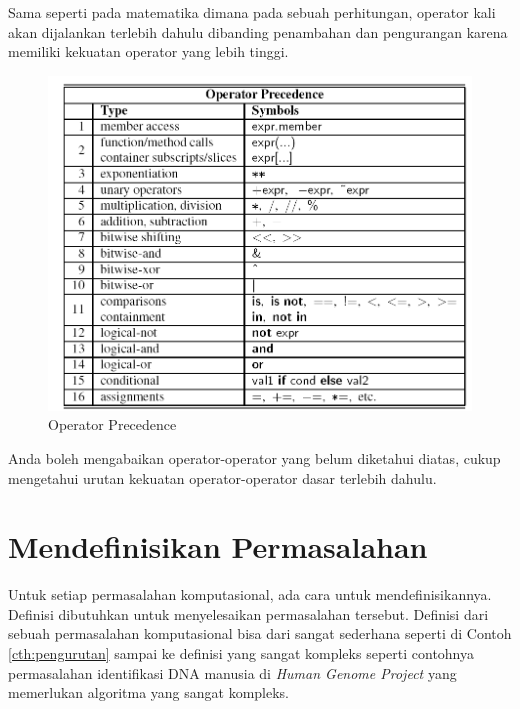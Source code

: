 \FloatBarrier

Sama seperti pada matematika dimana pada sebuah perhitungan, operator kali akan dijalankan terlebih dahulu dibanding penambahan dan pengurangan karena memiliki kekuatan operator yang lebih tinggi. 
	\begin{figure}
	\includegraphics[scale=0.55]{fig/1/Gambar21.png}
	\caption{Operator Precedence}
	\label{fig:operatorPrecedence}
	\end{figure}	
Anda boleh mengabaikan operator-operator yang belum diketahui diatas, cukup mengetahui urutan kekuatan operator-operator dasar terlebih dahulu.	

\section{Mendefinisikan Permasalahan}

Untuk setiap permasalahan komputasional, ada cara untuk mendefinisikannya. Definisi dibutuhkan untuk menyelesaikan permasalahan tersebut. Definisi dari sebuah permasalahan komputasional bisa dari sangat sederhana seperti di Contoh \ref{cth:pengurutan} sampai ke definisi yang sangat kompleks seperti contohnya permasalahan identifikasi DNA manusia di \textit{Human Genome Project} yang memerlukan algoritma yang sangat kompleks.

